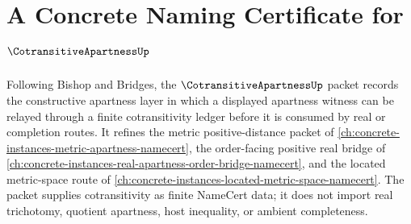 \chapter{A Concrete Naming Certificate for $\CotransitiveApartnessUp$}
\label{ch:concrete-instances-cotransitive-apartness-namecert}

Following Bishop and Bridges, the $\CotransitiveApartnessUp$ packet records the constructive apartness layer in which a displayed apartness witness can be relayed through a finite cotransitivity ledger before it is consumed by real or completion routes. It refines the metric positive-distance packet of \autoref{ch:concrete-instances-metric-apartness-namecert}, the order-facing positive real bridge of \autoref{ch:concrete-instances-real-apartness-order-bridge-namecert}, and the located metric-space route of \autoref{ch:concrete-instances-located-metric-space-namecert}. The packet supplies cotransitivity as finite NameCert data; it does not import real trichotomy, quotient apartness, host inequality, or ambient completeness.

